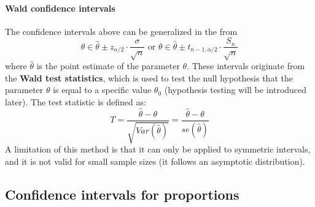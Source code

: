\paragraph{Wald confidence intervals}
The confidence intervals above can be generalized in the from
\begin{equation*}
    \theta \in \hat{\theta} \pm z_{\alpha/2} \cdot \frac{\sigma}{\sqrt{n}} \text{ or } \theta \in \hat{\theta} \pm t_{n-1, \alpha/2} \cdot \frac{S_n}{\sqrt{n}}
\end{equation*}
where $\hat{\theta}$ is the point estimate of the parameter $\theta$. These intervals originate from the \textbf{Wald test statistics}, which is used to test the null hypothesis that the parameter $\theta$ is equal to a specific value $\theta_0$ (hypothesis testing will be introduced later). The test statistic is defined as:
\begin{equation*}
    T = \frac{\hat{\theta} - \theta}{\sqrt{Var(\hat{\theta})}} = \frac{\hat{\theta} - \theta}{se(\hat{\theta})}
\end{equation*}
A limitation of this method is that it can only be applied to symmetric intervals, and it is not valid for small sample sizes (it follows an asymptotic distribution).

\subsection{Confidence intervals for proportions}

